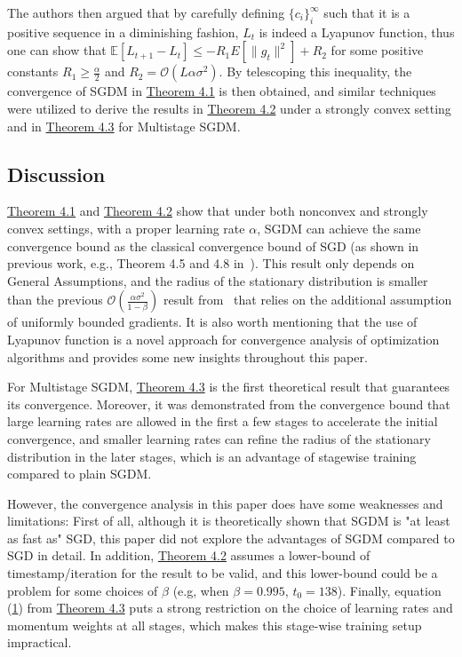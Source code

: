 \documentclass{article}
\begin{document}
The authors then argued that by carefully defining $\{c_i\}_i^\infty$ such that it is a positive sequence in a diminishing fashion, $L_t$ is indeed a Lyapunov function, thus one can show that $\mathbb{E}[L_{t + 1} - L_t] \leq -R_1E[\|g_t\|^2] + R_2$ for some positive constants $R_1 \geq \frac{\alpha}{2}$ and $R_2 = \mathcal{O}(L\alpha\sigma^2)$. By telescoping this inequality, the convergence of SGDM in \hyperref[theom41]{Theorem 4.1} is then obtained, and similar techniques were utilized to derive the results in \hyperref[theom42]{Theorem 4.2} under a strongly convex setting and in \hyperref[theom43]{Theorem 4.3} for Multistage SGDM.
\subsection{Discussion}
\hyperref[theom41]{Theorem 4.1} and \hyperref[theom42]{Theorem 4.2} show that under both nonconvex and strongly convex settings, with a proper learning rate $\alpha$, SGDM can achieve the same convergence bound as the classical convergence bound of SGD (as shown in previous work, e.g., Theorem 4.5 and 4.8 in~\cite{https://doi.org/10.48550/arxiv.1606.04838}). This result only depends on General Assumptions, and the radius of the stationary distribution is smaller than the previous $\mathcal{O}(\frac{\alpha\sigma^2}{1 - \beta})$ result from~\cite{https://doi.org/10.48550/arxiv.1905.03817} that relies on the additional assumption of uniformly bounded gradients. It is also worth mentioning that the use of Lyapunov function is a novel approach for convergence analysis of optimization algorithms and provides some new insights throughout this paper. 

For Multistage SGDM, \hyperref[theom42]{Theorem 4.3} is the first theoretical result that guarantees its convergence. Moreover, it was demonstrated from the convergence bound that large learning rates are allowed in the first a few stages to accelerate the initial convergence, and smaller learning rates can refine the radius of the stationary distribution in the later stages, which is an advantage of stagewise training compared to plain SGDM.

However, the convergence analysis in this paper does have some weaknesses and limitations: First of all, although it is theoretically shown that SGDM is "at least as fast as" SGD, this paper did not explore the advantages of SGDM compared to SGD in detail. In addition, \hyperref[theom42]{Theorem 4.2} assumes a lower-bound of timestamp/iteration for the result to be valid, and this lower-bound could be a problem for some choices of $\beta$ (e.g, when $\beta = 0.995$, $t_0 = 138$). Finally, equation (\hyperref[eq41]{1}) from \hyperref[theom43]{Theorem 4.3} puts a strong restriction on the choice of learning rates and momentum weights at all stages, which makes this stage-wise training setup impractical.
\end{document}
